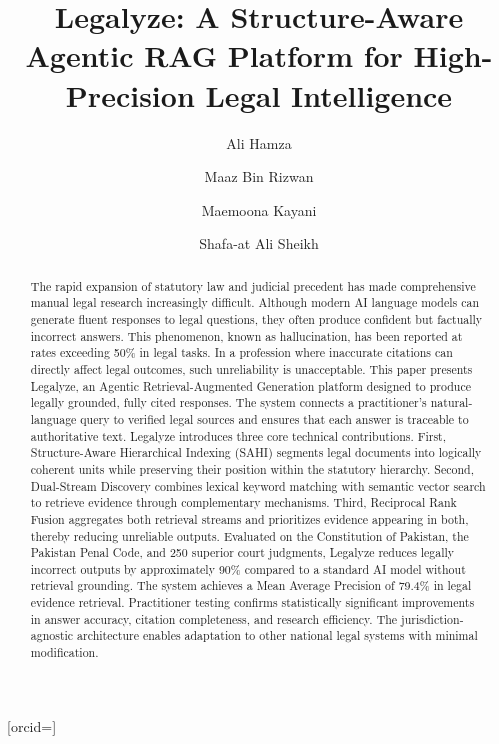 \documentclass[a4paper,fleqn]{cas-dc}
\begin{document}
\let\WriteBookmarks\relax
\def\floatpagepagefraction{1}
\def\textpagefraction{.001}



\title [mode = title]{Legalyze: A Structure-Aware Agentic RAG Platform for High-Precision Legal Intelligence}

\author[1]{Ali Hamza}[orcid=]
\cormark[1]

\author[1]{Maaz Bin Rizwan}
\author[1]{Maemoona Kayani}
\author[1]{Shafa-at Ali Sheikh}

\address[1]{National University of Sciences and Technology (NUST), Pakistan}


\begin{abstract}
The rapid expansion of statutory law and judicial precedent has made comprehensive manual legal research increasingly difficult. Although modern AI language models can generate fluent responses to legal questions, they often produce confident but factually incorrect answers. This phenomenon, known as hallucination, has been reported at rates exceeding 50\% in legal tasks. In a profession where inaccurate citations can directly affect legal outcomes, such unreliability is unacceptable. This paper presents Legalyze, an Agentic Retrieval-Augmented Generation platform designed to produce legally grounded, fully cited responses. The system connects a practitioner’s natural-language query to verified legal sources and ensures that each answer is traceable to authoritative text. Legalyze introduces three core technical contributions. First, Structure-Aware Hierarchical Indexing (SAHI) segments legal documents into logically coherent units while preserving their position within the statutory hierarchy. Second, Dual-Stream Discovery combines lexical keyword matching with semantic vector search to retrieve evidence through complementary mechanisms. Third, Reciprocal Rank Fusion aggregates both retrieval streams and prioritizes evidence appearing in both, thereby reducing unreliable outputs. Evaluated on the Constitution of Pakistan, the Pakistan Penal Code, and 250 superior court judgments, Legalyze reduces legally incorrect outputs by approximately 90\% compared to a standard AI model without retrieval grounding. The system achieves a Mean Average Precision of 79.4\% in legal evidence retrieval. Practitioner testing confirms statistically significant improvements in answer accuracy, citation completeness, and research efficiency. The jurisdiction-agnostic architecture enables adaptation to other national legal systems with minimal modification.
\end{abstract}
\end{document}

